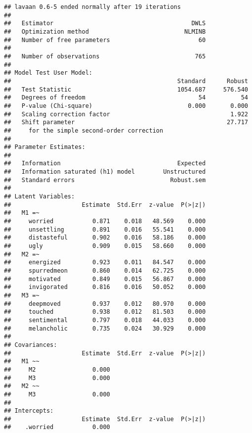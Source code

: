 \documentclass[
]{article}
\begin{document}
\begin{verbatim}
## lavaan 0.6-5 ended normally after 19 iterations
## 
##   Estimator                                       DWLS
##   Optimization method                           NLMINB
##   Number of free parameters                         60
##                                                       
##   Number of observations                           765
##                                                       
## Model Test User Model:
##                                               Standard      Robust
##   Test Statistic                              1054.687     576.540
##   Degrees of freedom                                54          54
##   P-value (Chi-square)                           0.000       0.000
##   Scaling correction factor                                  1.922
##   Shift parameter                                           27.717
##     for the simple second-order correction 
## 
## Parameter Estimates:
## 
##   Information                                 Expected
##   Information saturated (h1) model        Unstructured
##   Standard errors                           Robust.sem
## 
## Latent Variables:
##                    Estimate  Std.Err  z-value  P(>|z|)
##   M1 =~                                               
##     worried           0.871    0.018   48.569    0.000
##     unsettling        0.891    0.016   55.541    0.000
##     distasteful       0.902    0.016   58.186    0.000
##     ugly              0.909    0.015   58.660    0.000
##   M2 =~                                               
##     energized         0.923    0.011   84.547    0.000
##     spurredmeon       0.860    0.014   62.725    0.000
##     motivated         0.849    0.015   56.867    0.000
##     invigorated       0.816    0.016   50.052    0.000
##   M3 =~                                               
##     deepmoved         0.937    0.012   80.970    0.000
##     touched           0.938    0.012   81.503    0.000
##     sentimental       0.797    0.018   44.033    0.000
##     melancholic       0.735    0.024   30.929    0.000
## 
## Covariances:
##                    Estimate  Std.Err  z-value  P(>|z|)
##   M1 ~~                                               
##     M2                0.000                           
##     M3                0.000                           
##   M2 ~~                                               
##     M3                0.000                           
## 
## Intercepts:
##                    Estimate  Std.Err  z-value  P(>|z|)
##    .worried           0.000                           

\end{verbatim}
\end{document}
